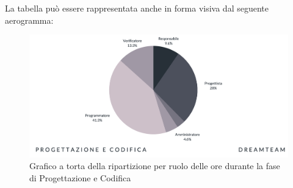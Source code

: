 La tabella può essere rappresentata anche in forma visiva dal seguente aerogramma:
\begin{figure}[H]
\centering
\includegraphics[scale=0.50]{Sezioni/SezioniPreventivo/grafici/progettazione/Progettazione_costi.png}
\caption{Grafico a torta della ripartizione per ruolo delle ore durante la fase di Progettazione e Codifica}
\end{figure}



